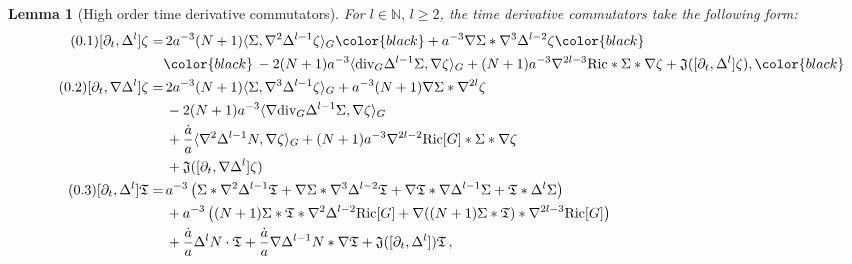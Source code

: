 \documentclass[11pt,leqno,textwidth=10cm]{amsart}
\numberwithin{equation}{section}
\theoremstyle{definition}
\theoremstyle{plain}
\newtheorem{lemma}[definition]{Lemma}
\newcommand{\1}{\mathbbm{1}}
\newcommand{\N}{\mathbb{N}}
\newcommand{\Ric}{\text{\normalfont{Ric}}}
\newcommand{\del}{\partial}
\newcommand{\Lap}{\Delta}
\renewcommand{\div}{\text{\normalfont{div}}}
\newcommand{\numberthis}{\addtocounter{equation}{1}\tag{\theequation}}
\renewcommand{\theequation}{\arabic{section}.\arabic{equation}}
\newcommand{\change}[1]{\color{black}#1\color{black}}
\begin{document}
\begin{lemma}[High order time derivative commutators]\label{lem:com-time}
For $l\in\N,\,l\geq 2$, the time derivative commutators take the following form:
\begin{subequations}
\begin{align*}
\numberthis\label{eq:[del-t,Lap-l]zeta}[\del_t,\Lap^l]\zeta=&\,2a^{-3}(N+1)\langle\Sigma,\nabla^2\Lap^{l-1}\zeta\rangle_G\change{+a^{-3}\nabla\Sigma\ast\nabla^3\Lap^{l-2}\zeta}\\
&\change{\,-2(N+1)a^{-3}\langle\div_G\Lap^{l-1}\Sigma,\nabla\zeta\rangle_G+(N+1)a^{-3}\nabla^{2l-3}\Ric\ast\Sigma\ast\nabla\zeta+\mathfrak{J}([\del_t,\Lap^l]\zeta),}\\
\numberthis\label{eq:[del-t,nabla-Lap-l]zeta}[\del_t,\nabla\Lap^l]\zeta=&\,2a^{-3}(N+1)\langle\Sigma,\nabla^3\Lap^{l-1}\zeta\rangle_G+a^{-3}(N+1)\nabla\Sigma\ast\nabla^{2l}\zeta\\
&\,-2(N+1)a^{-3}\langle \nabla\div_G\Lap^{l-1}\Sigma,\nabla\zeta\rangle_G\\
&\,+\frac{\dot{a}}a\langle\nabla^2\Lap^{l-1}N,\nabla\zeta\rangle_G+(N+1)a^{-3}\nabla^{2l-2}\Ric[G]\ast\Sigma\ast\nabla\zeta\\
&\,+\mathfrak{J}([\del_t,\nabla\Lap^l]\zeta)\\
\numberthis\label{eq:[del-t,Lap-l]T}[\del_t,\Lap^l]\mathfrak{T}=&\,a^{-3}\left(\Sigma\ast\nabla^2\Lap^{l-1}\mathfrak{T}+\nabla\Sigma\ast\nabla^3\Lap^{l-2}\mathfrak{T}+\nabla \mathfrak{T}\ast\nabla\Lap^{l-1}\Sigma+\mathfrak{T}\ast\Lap^{l}\Sigma\right)\\
&\,+a^{-3}\left((N+1)\Sigma\ast \mathfrak{T}\ast\nabla^2\Lap^{l-2}\Ric[G]+\nabla((N+1)\Sigma\ast \mathfrak{T})\ast\nabla^{2l-3}\Ric[G]\right)\\
&\,+\frac{\dot{a}}a\Lap^lN\cdot \mathfrak{T}+\frac{\dot{a}}a\nabla\Lap^{l-1}N\ast\nabla \mathfrak{T}+\mathfrak{J}([\del_t,\Lap^l])\mathfrak{T}\,,\\

\end{align*}
\end{subequations}
\end{lemma}
\end{document}
